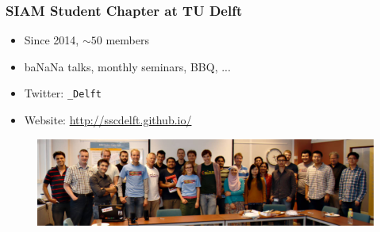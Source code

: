 \documentclass{beamer}
\begin{document}
\begin{frame}
\begin{tikzpicture}[overlay]
\end{tikzpicture}
\end{frame}

\begin{frame}
 \frametitle{SIAM Student Chapter at TU Delft}
 \begin{itemize}
  \item Since 2014, $\sim \! 50$ members
  \item ba{\color{red}NaN}a talks, monthly seminars, BBQ, ...
  \item Twitter: \texttt{\@SSC\_Delft}
  \item Website: \href{http://sscdelft.github.io/}{http://sscdelft.github.io/}
 \end{itemize}

   \begin{figure}[h]
  \includegraphics[width=\textwidth]{pics/ssc_delft.png}
  \end{figure}
\end{frame}
\end{document}
